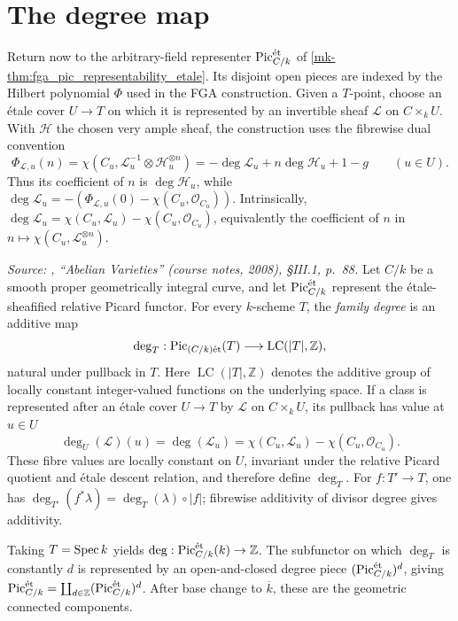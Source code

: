 \section{The degree map}
\label{mk-sec:pic_degree}

Return now to the arbitrary-field representer \(\operatorname{Pic}^{\mathrm{\acute{e}t}}_{C/k}\) of
\ref{mk-thm:fga_pic_representability_etale}. Its disjoint open pieces are indexed
by the Hilbert polynomial \(\Phi\) used in the FGA construction. Given a
\(T\)-point, choose an \'etale cover \(U\to T\) on which it is represented by
an invertible sheaf \(\mathcal L\) on \(C\times_kU\). With \(\mathcal H\) the
chosen very ample sheaf, the construction uses the fibrewise dual convention
\[
  \Phi_{\mathcal L,u}(n)
  =\chi(C_u,\mathcal L_u^{-1}\otimes\mathcal H_u^{\otimes n})
  =-\deg\mathcal L_u+n\deg\mathcal H_u+1-g
  \qquad (u\in U).
\]
Thus its coefficient of \(n\) is \(\deg\mathcal H_u\), while
\(\deg\mathcal L_u=-(\Phi_{\mathcal L,u}(0)-
\chi(C_u,\mathcal O_{C_u}))\). Intrinsically,
\(\deg\mathcal L_u=\chi(C_u,\mathcal L_u)-
\chi(C_u,\mathcal O_{C_u})\), equivalently the coefficient of \(n\) in
\(n\mapsto\chi(C_u,\mathcal L_u^{\otimes n})\).

\begin{definition}\label{mk-def:divisor_degree_pic}
  \notready
  \textit{Source: \cite{milne-av}, ``Abelian Varieties'' (course notes, 2008),
  \S III.1, p.~88.}
  Let \(C/k\) be a smooth proper geometrically integral curve, and let
  \(\operatorname{Pic}^{\mathrm{\acute{e}t}}_{C/k}\) represent the \'etale-sheafified relative Picard
  functor. For every \(k\)-scheme \(T\), the \emph{family degree} is an
  additive map
  \[
    \deg_T:\operatorname{Pic}_{(C/k)\mathrm{\acute{e}t}}(T)
      \longrightarrow \operatorname{LC}(|T|,\mathbb Z),
  \]
  natural under pullback in \(T\). Here
  \(\operatorname{LC}(|T|,\mathbb Z)\) denotes the additive group of locally
  constant integer-valued functions on the underlying space. If a class is
  represented after an \'etale cover \(U\to T\) by \(\mathcal L\) on
  \(C\times_kU\), its pullback has value at \(u\in U\)
  \[
    \deg_U(\mathcal L)(u)=\deg(\mathcal L_u)
    =\chi(C_u,\mathcal L_u)-\chi(C_u,\mathcal O_{C_u}).
  \]
  These fibre values are locally constant on \(U\), invariant under the
  relative Picard quotient and \'etale descent relation, and therefore define
  \(\deg_T\). For \(f:T'\to T\), one has
  \(\deg_{T'}(f^*\lambda)=\deg_T(\lambda)\circ|f|\); fibrewise additivity of
  divisor degree gives additivity.

  Taking \(T=\operatorname{Spec} k\) yields
  \(\deg:\operatorname{Pic}^{\mathrm{\acute{e}t}}_{C/k}(k)\to\mathbb Z\). The subfunctor on which
  \(\deg_T\) is constantly \(d\) is represented by an open-and-closed degree
  piece \((\operatorname{Pic}^{\mathrm{\acute{e}t}}_{C/k})^d\), giving
  \(\operatorname{Pic}^{\mathrm{\acute{e}t}}_{C/k}=\coprod_{d\in\mathbb Z}(\operatorname{Pic}^{\mathrm{\acute{e}t}}_{C/k})^d\). After
  base change to \(\overline k\), these are the geometric connected components.
\end{definition}

